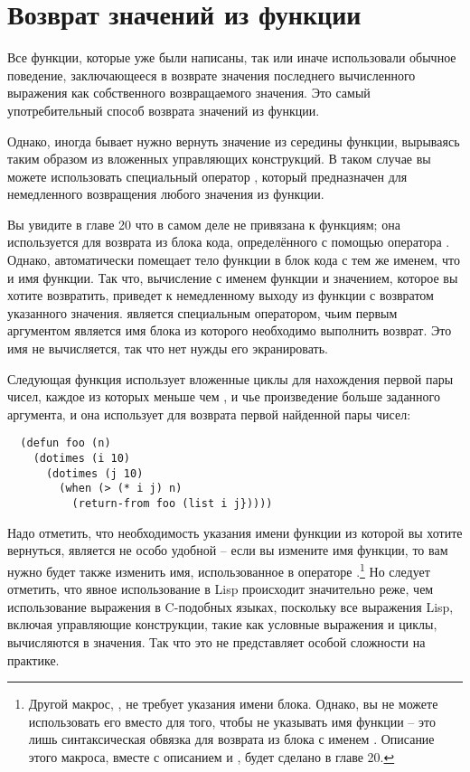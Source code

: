\section{Возврат значений из функции}

Все функции, которые уже были написаны, так или иначе использовали обычное поведение,
заключающееся в возврате значения последнего вычисленного выражения как собственного
возвращаемого значения.  Это самый употребительный способ возврата значений из функции.

Однако, иногда бывает нужно вернуть значение из середины функции, вырываясь таким образом
из вложенных управляющих конструкций.  В таком случае вы можете использовать специальный
оператор , который предназначен для немедленного возвращения любого
значения из функции.

Вы увидите в главе 20 что  в самом деле не привязана к функциям; она
используется для возврата из блока кода, определённого с помощью оператора .
Однако,  автоматически помещает тело функции в блок кода с тем же именем, что и
имя функции.  Так что, вычисление  с именем функции и значением, которое вы
хотите возвратить, приведет к немедленному выходу из функции с возвратом указанного
значения.   является специальным оператором, чьим первым аргументом
является имя блока из которого необходимо выполнить возврат.  Это имя не вычисляется, так
что нет нужды его экранировать.

Следующая функция использует вложенные циклы для нахождения первой пары чисел, каждое из
которых меньше чем , и чье произведение больше заданного аргумента, и она использует
 для возврата первой найденной пары чисел:

\begin{lstlisting}
  (defun foo (n)
    (dotimes (i 10)
      (dotimes (j 10)
        (when (> (* i j) n)
          (return-from foo (list i j}))))
\end{lstlisting}

Надо отметить, что необходимость указания имени функции из которой вы хотите вернуться,
является не особо удобной -- если вы измените имя функции, то вам нужно будет также
изменить имя, использованное в операторе .\footnote{Другой макрос,
  , не требует указания имени блока.  Однако, вы не можете использовать его
  вместо  для того, чтобы не указывать имя функции -- это лишь
  синтаксическая обвязка для возврата из блока с именем .  Описание этого
  макроса, вместе с описанием  и , будет сделано в главе
  20.}  Но следует отметить, что явное использование  в Lisp происходит
значительно реже, чем использование выражения  в C-подобных языках, поскольку
все выражения Lisp, включая управляющие конструкции, такие как условные выражения и циклы,
вычисляются в значения.  Так что это не представляет особой сложности на практике.

